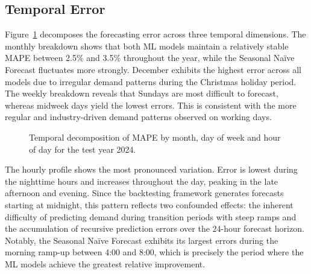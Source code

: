 \subsection{Temporal Error}
\label{subsec:temporal_error}
Figure~\ref{fig:temporal_error} decomposes the forecasting error across three temporal dimensions. The monthly breakdown shows that both ML models maintain a relatively stable \acs{MAPE} between 2.5\% and 3.5\% throughout the year, while the Seasonal Na\"{i}ve Forecast fluctuates more strongly. December exhibits the highest error across all models due to irregular demand patterns during the Christmas holiday period. The weekly breakdown reveals that Sundays are most difficult to forecast, whereas midweek days yield the lowest errors. This is consistent with the more regular and industry-driven demand patterns observed on working days.
\begin{figure}[ht]
    \centering
    
    \caption{Temporal decomposition of \acs{MAPE} by month, day of week and hour of day for the test year 2024.}
    \label{fig:temporal_error}
\end{figure}

The hourly profile shows the most pronounced variation. Error is lowest during the nighttime hours and increases throughout the day, peaking in the late afternoon and evening. Since the backtesting framework generates forecasts starting at midnight, this pattern reflects two confounded effects: the inherent difficulty of predicting demand during transition periods with steep ramps and the accumulation of recursive prediction errors over the 24-hour forecast horizon. Notably, the Seasonal Na\"{i}ve Forecast exhibits its largest errors during the morning ramp-up between 4:00 and 8:00, which is precisely the period where the ML models achieve the greatest relative improvement.


